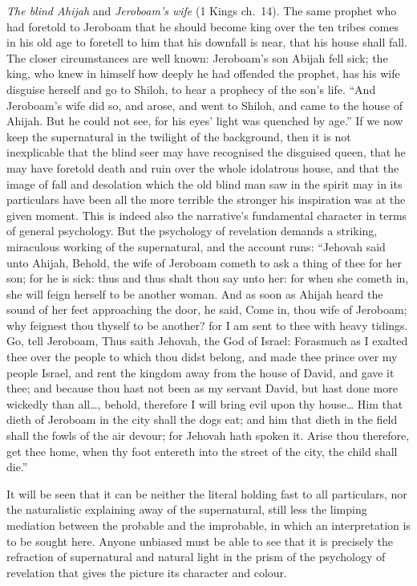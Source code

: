 \documentclass[12pt,a4paper,openany]{book}
\newcommand{\opage}[1]{\marginnote{\footnotesize\textit{[#1]}}}
\begin{document}
\emph{The blind Ahijah} and \emph{Jeroboam's wife}
(1 Kings ch.~14). The same prophet who had foretold to
Jeroboam that he should become king over the ten
tribes comes in his old age to foretell to him
that his downfall is near, that his house shall fall.
The closer circumstances are well known: Jeroboam's
son Abijah fell sick; the king, who knew in himself
how deeply he had offended the prophet, has his
wife disguise herself and go to Shiloh, to hear a
prophecy of the son's life. ``And Jeroboam's
wife did so, and arose, and went to Shiloh, and came to
the house of Ahijah. But he could not see, for his eyes'
light was quenched by age.'' If we now keep the
supernatural in the twilight of the background, then it is not
inexplicable that the blind seer may have recognised
the disguised queen, that he may have foretold
death and ruin over the whole idolatrous house, and
that the image of fall and desolation which the old
blind man saw in the spirit may in its particulars have
been all the more terrible the stronger his inspiration
was at the given moment. This is indeed also the narrative's
fundamental character in terms of general psychology. But the psychology of revelation
demands a striking, miraculous working
of the supernatural, and the account runs: ``Jehovah
said unto Ahijah, Behold, the wife of Jeroboam cometh
to ask a thing of thee for her son; for he is
sick: thus and thus shalt thou say unto her: for when she
cometh in, she will feign herself to be another woman. And as
soon as Ahijah heard the sound of her feet approaching the door,
\setcounter{footnote}{0}%
\opage{41}he said, Come in, thou wife of Jeroboam; why feignest
thou thyself to be another? for I am sent to thee
with heavy tidings. Go, tell Jeroboam, Thus
saith Jehovah, the God of Israel: Forasmuch as I exalted thee over
the people to which thou didst belong, and made thee prince over
my people Israel, and rent the kingdom away from the house of David, and
gave it thee; and because thou hast not been as my servant
David, but hast done more wickedly than all\dots{}, behold,
therefore I will bring evil upon thy house\dots{} Him
that dieth of Jeroboam in the city shall the dogs eat;
and him that dieth in the field shall the fowls of the air devour;
for Jehovah hath spoken it. Arise thou therefore, get thee home,
when thy foot entereth into the street of the city, the child shall die.''

It will be seen that it can be neither the literal
holding fast to all particulars, nor the
naturalistic explaining away of the supernatural, still
less the limping mediation between the probable and the
improbable, in which an interpretation is to be sought here.
Anyone unbiased must be able to see that it is precisely the refraction
of supernatural and natural light in the prism of the psychology of revelation
that gives the picture its character
and colour.
\end{document}
